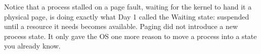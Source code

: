 \documentclass[11pt]{article}
\begin{document}
\bigskip
\noindent
Notice that a process stalled on a page fault, waiting for the kernel to hand it a physical page, is doing exactly what Day 1 called the Waiting state: suspended until a resource it needs becomes available. Paging did not introduce a new process state. It only gave the OS one more reason to move a process into a state you already know.
\end{document}
